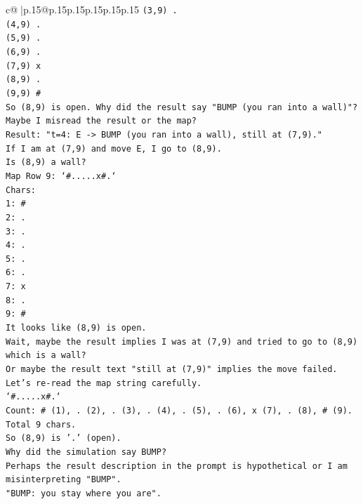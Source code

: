 \documentclass{article}
\begin{document}
{\begin{supertabular}{c@{$\;$}|p{.15\linewidth}@{}p{.15\linewidth}p{.15\linewidth}p{.15\linewidth}p{.15\linewidth}p{.15\linewidth}}
{{{\texttt{(3,9) .} \\
\texttt{(4,9) .} \\
\texttt{(5,9) .} \\
\texttt{(6,9) .} \\
\texttt{(7,9) x} \\
\texttt{(8,9) .} \\
\texttt{(9,9) \#} \\
\texttt{So (8,9) is open. Why did the result say "BUMP (you ran into a wall)"?} \\
\texttt{Maybe I misread the result or the map?} \\
\texttt{Result: "t=4: E {-}> BUMP (you ran into a wall), still at (7,9)."} \\
\texttt{If I am at (7,9) and move E, I go to (8,9).} \\
\texttt{Is (8,9) a wall?} \\
\texttt{Map Row 9: `\#.....x\#.`} \\
\texttt{Chars:} \\
\texttt{1: \#} \\
\texttt{2: .} \\
\texttt{3: .} \\
\texttt{4: .} \\
\texttt{5: .} \\
\texttt{6: .} \\
\texttt{7: x} \\
\texttt{8: .} \\
\texttt{9: \#} \\
\texttt{It looks like (8,9) is open.} \\
\texttt{Wait, maybe the result implies I was at (7,9) and tried to go to (8,9) which is a wall?} \\
\texttt{Or maybe the result text "still at (7,9)" implies the move failed.} \\
\texttt{Let's re{-}read the map string carefully.} \\
\texttt{`\#.....x\#.`} \\
\texttt{Count: \# (1), . (2), . (3), . (4), . (5), . (6), x (7), . (8), \# (9).} \\
\texttt{Total 9 chars.} \\
\texttt{So (8,9) is '.' (open).} \\
\texttt{Why did the simulation say BUMP?} \\
\texttt{Perhaps the result description in the prompt is hypothetical or I am misinterpreting "BUMP".} \\
\texttt{"BUMP: you stay where you are".} \\
}}}
\end{supertabular}}
\end{document}
